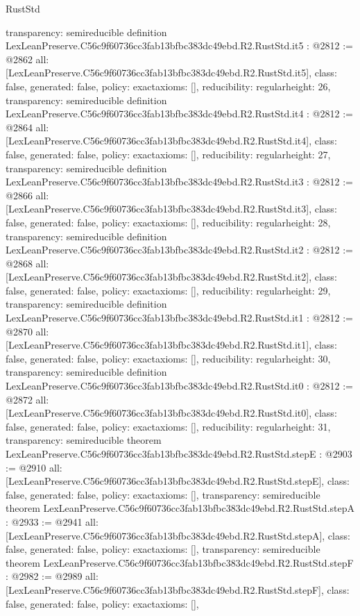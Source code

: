 \begin{lexlean}{RustStd}
\begin{coremodule}
{  transparency: semireducible
}
definition LexLeanPreserve.C56c9f60736cc3fab13bfbc383dc49ebd.R2.RustStd.it5 : @2812 := @2862 {
  all: [LexLeanPreserve.C56c9f60736cc3fab13bfbc383dc49ebd.R2.RustStd.it5],
  class: false,
  generated: false,
  policy: exact{axioms: []},
  reducibility: regular{height: 26},
  transparency: semireducible
}
definition LexLeanPreserve.C56c9f60736cc3fab13bfbc383dc49ebd.R2.RustStd.it4 : @2812 := @2864 {
  all: [LexLeanPreserve.C56c9f60736cc3fab13bfbc383dc49ebd.R2.RustStd.it4],
  class: false,
  generated: false,
  policy: exact{axioms: []},
  reducibility: regular{height: 27},
  transparency: semireducible
}
definition LexLeanPreserve.C56c9f60736cc3fab13bfbc383dc49ebd.R2.RustStd.it3 : @2812 := @2866 {
  all: [LexLeanPreserve.C56c9f60736cc3fab13bfbc383dc49ebd.R2.RustStd.it3],
  class: false,
  generated: false,
  policy: exact{axioms: []},
  reducibility: regular{height: 28},
  transparency: semireducible
}
definition LexLeanPreserve.C56c9f60736cc3fab13bfbc383dc49ebd.R2.RustStd.it2 : @2812 := @2868 {
  all: [LexLeanPreserve.C56c9f60736cc3fab13bfbc383dc49ebd.R2.RustStd.it2],
  class: false,
  generated: false,
  policy: exact{axioms: []},
  reducibility: regular{height: 29},
  transparency: semireducible
}
definition LexLeanPreserve.C56c9f60736cc3fab13bfbc383dc49ebd.R2.RustStd.it1 : @2812 := @2870 {
  all: [LexLeanPreserve.C56c9f60736cc3fab13bfbc383dc49ebd.R2.RustStd.it1],
  class: false,
  generated: false,
  policy: exact{axioms: []},
  reducibility: regular{height: 30},
  transparency: semireducible
}
definition LexLeanPreserve.C56c9f60736cc3fab13bfbc383dc49ebd.R2.RustStd.it0 : @2812 := @2872 {
  all: [LexLeanPreserve.C56c9f60736cc3fab13bfbc383dc49ebd.R2.RustStd.it0],
  class: false,
  generated: false,
  policy: exact{axioms: []},
  reducibility: regular{height: 31},
  transparency: semireducible
}
theorem LexLeanPreserve.C56c9f60736cc3fab13bfbc383dc49ebd.R2.RustStd.stepE : @2903 := @2910 {
  all: [LexLeanPreserve.C56c9f60736cc3fab13bfbc383dc49ebd.R2.RustStd.stepE],
  class: false,
  generated: false,
  policy: exact{axioms: []},
  transparency: semireducible
}
theorem LexLeanPreserve.C56c9f60736cc3fab13bfbc383dc49ebd.R2.RustStd.stepA : @2933 := @2941 {
  all: [LexLeanPreserve.C56c9f60736cc3fab13bfbc383dc49ebd.R2.RustStd.stepA],
  class: false,
  generated: false,
  policy: exact{axioms: []},
  transparency: semireducible
}
theorem LexLeanPreserve.C56c9f60736cc3fab13bfbc383dc49ebd.R2.RustStd.stepF : @2982 := @2989 {
  all: [LexLeanPreserve.C56c9f60736cc3fab13bfbc383dc49ebd.R2.RustStd.stepF],
  class: false,
  generated: false,
  policy: exact{axioms: []},
}
\end{coremodule}
\end{lexlean}
